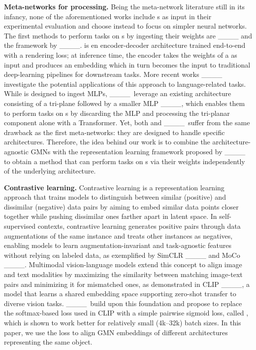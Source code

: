 \textbf{Meta-networks for \nerf{} processing.}
Being the meta-network literature still in its infancy, none of the aforementioned works include \nerf{}s as input in their experimental evaluation and choose instead to focus on simpler neural networks. The first methods to perform tasks on \nerf{}s by ingesting their weights are \nftovec{} ____ and the framework by ____. \nftovec{} is en encoder-decoder architecture trained end-to-end with a rendering loss; at inference time, the encoder takes the weights of a \nerf{} as input and produces an embedding which in turn becomes the input to traditional deep-learning pipelines for downstream tasks. More recent works ____ investigate the potential applications of this approach to language-related tasks. While \nftovec{} is designed to ingest MLPs, ____\ leverage an existing \nerf{} architecture consisting of a tri-plane followed by a smaller MLP ____, which enables them to perform tasks on \nerf{}s by discarding the MLP and processing the tri-planar component alone with a Transformer. Yet, both \nftovec{} and ____\ suffer from the same drawback as the first meta-networks: they are designed to handle specific \nerf{} architectures. Therefore, the idea behind our work is to combine the architecture-agnostic GMNs with the representation learning framework proposed by ____ to obtain a method that can perform tasks on \nerf{}s via their weights independently of the underlying architecture.

\textbf{Contrastive learning.} 
Contrastive learning is a representation learning approach that trains models to distinguish between similar (positive) and dissimilar (negative) data pairs by aiming to embed similar data points closer together while pushing dissimilar ones farther apart in latent space. In self-supervised contexts, contrastive learning generates positive pairs through data augmentations of the same instance and treats other instances as negatives, enabling models to learn augmentation-invariant and task-agnostic features without relying on labeled data, as exemplified by SimCLR ____ and MoCo ____. Multimodal vision-language models extend this concept to align image and text modalities by maximizing the similarity between matching image-text pairs and minimizing it for mismatched ones, as demonstrated in CLIP ____, a model that learns a shared embedding space supporting zero-shot transfer to diverse vision tasks. ____\ build upon this foundation and propose to replace the softmax-based loss used in CLIP with a simple pairwise sigmoid loss, called \siglip{}, which is shown to work better for relatively small (4k--32k) batch sizes. In this paper, we use the \siglip{} loss to align GMN embeddings of different \nerf{} architectures representing the same object.

